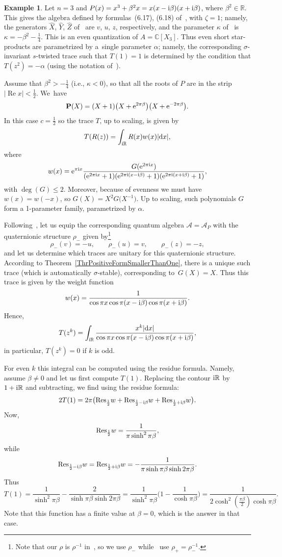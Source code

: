 \documentclass[pdftex]{sigma}
\newcommand{\mc}[1]{\mathcal{#1}}
\renewcommand{\Re}{\operatorname{Re}}
\theoremstyle{definition}
\newtheorem{Example}[Theorem]{Example}
\numberwithin{equation}{section}
\begin{document}
\begin{Example}
Let $n=3$ and $P(x)=x^3+\beta^2x=x(x-{\rm i}\beta )(x+{\rm i}\beta )$, where $\beta^2\in \mathbb R$.
This gives the algebra defined by formulas~(6.17), (6.18)
of~\cite{BPR}, with $\zeta=1$; namely,
the generators $\hat X$, $\hat Y$, $\hat Z$ of~\cite{BPR} are $v$, $u$, $z$, respectively, and the parameter $\kappa$ of~\cite{BPR} is $\kappa=-\beta^2-\frac{1}{4}$.
This is an even quantization of $A=\mathbb C[X_3]$. Thus even short star-products are parametrized by a~single parameter $\alpha$; namely, the corresponding $\sigma$-invariant $s$-twisted trace such that $T(1)=1$ is determined by the condition that $T(z^2)=-\alpha$ (using the notation of~\cite{BPR}).

Assume that $\beta^2>-\frac{1}{4}$ (i.e., $\kappa<0$), so that all the roots of $P$ are in the strip $|\Re x|<\frac{1}{2}$. We~have
\[
\mathbf{P}(X)=(X+1)\big(X+{\rm e}^{2\pi \beta}\big)\big(X+{\rm e}^{-2\pi \beta}\big).
\]
In this case $c=\frac{1}{2}$ so the trace $T$, up to scaling, is given by
\[
T(R(z))=\int_{{\rm i}\mathbb R}R(x)w(x)|{\rm d}x|,
\]
where
\[
w(x)={\rm e}^{\pi {\rm i}x}\frac{G({\rm e}^{2\pi {\rm i}x})}{({\rm e}^{2\pi {\rm i}x}+1)({\rm e}^{2\pi {\rm i}(x-{\rm i}\beta )}+1)({\rm e}^{2\pi {\rm i}(x+{\rm i}\beta )}+1)},
\]
with $\deg(G)\le 2$. Moreover, because of evenness we must have $w(x)=w(-x)$, so $G(X)=X^2G\big(X^{-1}\big)$. Up to scaling, such polynomials $G$ form a 1-parameter family, parametrized by $\alpha$.

Following~\cite[Section~6.3]{BPR}, let us equip the corresponding quantum algebra $\mc A=\mc A_P$ with the quaternionic structure $\rho_-$ given by\footnote{Note that our $\rho$ is $\rho^{-1}$ in~\cite{BPR}, so we use $\rho_-$ while~\cite{BPR} use $\rho_+=\rho_-^{-1}$.}
\[
\rho_-(v)=-u,\qquad \rho_-(u)=v,\qquad \rho_-(z)=-z,
\]
 and let us determine which traces are unitary
for this quaternionic structure. According to The\-o\-rem~\ref{ThrPositiveFormSmallerThanOne}, there is a unique
such trace (which is automatically $\sigma$-stable), corresponding to~$G(X)=X$. Thus this trace is given by the weight function
\[
w(x)=\frac{1}{\cos \pi x\cos \pi (x-{\rm i}\beta )\cos\pi(x+{\rm i}\beta )}.
\]
Hence,
\[
T(z^{k})=\int_{{\rm i}\mathbb R}\frac{x^{k}|{\rm d}x|}{\cos \pi x\cos \pi (x-{\rm i}\beta )\cos\pi(x+{\rm i}\beta )},
\]
in particular, $T(z^k)=0$ if $k$ is odd.

For even $k$ this integral can be computed using the residue formula. Namely, assume $\beta\ne 0$ and let us first compute $T(1)$. Replacing the contour ${\rm i}\mathbb R$ by $1+{\rm i}\mathbb R$ and subtracting,
we find using the residue formula:
\[
2T(1)=2\pi\big({\rm Res}_{\frac{1}{2}}w+{\rm Res}_{\frac{1}{2}-{\rm i}\beta }w+{\rm Res}_{\frac{1}{2}+{\rm i}\beta }w\big).
\]
Now,
\[
{\rm Res}_{\frac{1}{2}}w=\frac{1}{\pi\sinh^2\pi \beta},
\]
while
\[
{\rm Res}_{\frac{1}{2}-{\rm i}\beta }w={\rm Res}_{\frac{1}{2}+{\rm i}\beta }w=-\frac{1}{\pi \sinh \pi\beta \sinh 2\pi \beta}.
\]
Thus
\[
T(1)=\frac{1}{\sinh^2\pi \beta}-\frac{2}{\sinh \pi\beta \sinh 2\pi\beta }=
\frac{1}{\sinh^2\pi \beta}\bigg(1-\frac{1}{\cosh \pi\beta }\bigg)=\frac{1}{2\cosh^2(\frac{\pi\beta }{2})\cosh \pi\beta }.
\]
Note that this function has a finite value at $\beta=0$, which is the answer in that case.


\end{Example}
\end{document}
